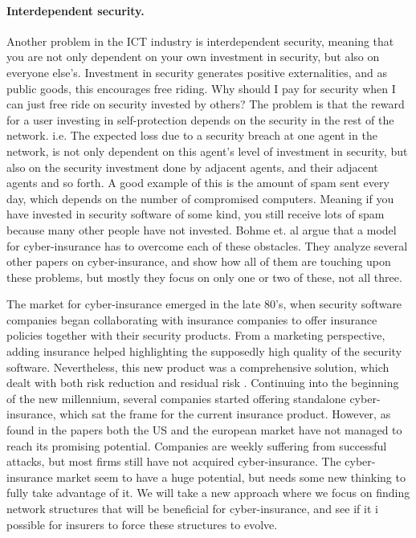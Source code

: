  \paragraph{Interdependent security.}
Another problem in the ICT industry is interdependent security, meaning that you are not only dependent on your own investment in security, but also on everyone else's. 
Investment in security generates positive externalities, and as public goods, this encourages free riding. Why should I pay for security when I can just free ride on security invested by others? The problem is that the reward for a user investing in self-protection depends on the security in the rest of the network. i.e. The expected loss due to a security breach at one agent in the network, is not only dependent on this agent's level of investment in security, but also on the security investment done by adjacent agents, and their adjacent agents and so forth. A good example of this is the amount of spam sent every day, which depends on the number of compromised computers. Meaning if you have invested in security software of some kind, you still receive lots of spam because many other people have not invested. 
  Bohme et. al argue that a model for cyber-insurance has to overcome each of these obstacles. 
They analyze several other papers on cyber-insurance, and show how all of them are touching upon these problems, but mostly they focus on only one or two of these, not all three. 

The market for cyber-insurance emerged in the late 80's, when security software companies began collaborating with insurance companies to offer insurance policies together with their security products. From a marketing perspective, adding insurance helped highlighting the supposedly high quality of the security software. Nevertheless, this new product was a comprehensive solution, which dealt with both risk reduction and residual risk \cite{bolot:new}. Continuing into the beginning of the new millennium, several companies started offering standalone cyber-insurance, which sat the frame for the current insurance product. However, as found in the papers \cite{ccost,evolvingcyber,CFCunder} both the US and the european market have not managed to reach its promising potential. Companies are weekly suffering from successful attacks, but most firms still have not acquired cyber-insurance. The cyber-insurance market seem to have a huge potential, but needs some new thinking to fully take advantage of it. We will take a new approach where we focus on finding network structures that will be beneficial for cyber-insurance, and see if it i possible for insurers to force these structures to evolve.
 

